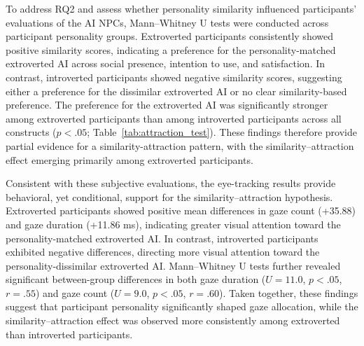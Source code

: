 \documentclass[a4paper,fleqn]{cas-sc}
\begin{document}
To address RQ2 and assess whether personality similarity influenced participants’ evaluations of the AI NPCs, Mann–Whitney U tests were conducted across participant personality groups. Extroverted participants consistently showed positive similarity scores, indicating a preference for the personality-matched extroverted AI across social presence, intention to use, and satisfaction. In contrast, introverted participants showed negative similarity scores, suggesting either a preference for the dissimilar extroverted AI or no clear similarity-based preference. The preference for the extroverted AI was significantly stronger among extroverted participants than among introverted participants across all constructs ($p < .05$; Table~\ref{tab:attraction_test}). These findings therefore provide partial evidence for a similarity-attraction pattern, with the similarity–attraction effect emerging primarily among extroverted participants.

Consistent with these subjective evaluations, the eye-tracking results provide behavioral, yet conditional, support for the similarity–attraction hypothesis. Extroverted participants showed positive mean differences in gaze count (+35.88) and gaze duration (+11.86 ms), indicating greater visual attention toward the personality-matched extroverted AI. In contrast, introverted participants exhibited negative differences, directing more visual attention toward the personality-dissimilar extroverted AI. Mann–Whitney U tests further revealed significant between-group differences in both gaze duration ($U = 11.0$, $p < .05$, $r = .55$) and gaze count ($U = 9.0$, $p < .05$, $r = .60$). Taken together, these findings suggest that participant personality significantly shaped gaze allocation, while the similarity–attraction effect was observed more consistently among extroverted than introverted participants.
\end{document}
